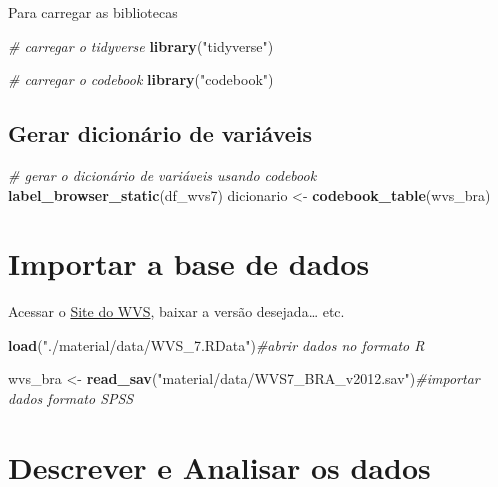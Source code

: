 \documentclass[
]{book}
\newenvironment{Shaded}{\begin{snugshade}}{\end{snugshade}}
\newcommand{\CommentTok}[1]{\textcolor[rgb]{0.56,0.35,0.01}{\textit{#1}}}
\newcommand{\KeywordTok}[1]{\textcolor[rgb]{0.13,0.29,0.53}{\textbf{#1}}}
\newcommand{\NormalTok}[1]{#1}
\newcommand{\StringTok}[1]{\textcolor[rgb]{0.31,0.60,0.02}{#1}}
\begin{document}
Para carregar as bibliotecas

\begin{Shaded}
\begin{Highlighting}[]
\CommentTok{# carregar o tidyverse}
\KeywordTok{library}\NormalTok{(}\StringTok{"tidyverse"}\NormalTok{)}

\CommentTok{# carregar o codebook}
\KeywordTok{library}\NormalTok{(}\StringTok{"codebook"}\NormalTok{)}
\end{Highlighting}
\end{Shaded}

\hypertarget{gerar-dicionuxe1rio-de-variuxe1veis}{%
\section{Gerar dicionário de variáveis}\label{gerar-dicionuxe1rio-de-variuxe1veis}}

\begin{Shaded}
\begin{Highlighting}[]
\CommentTok{# gerar o dicionário de variáveis usando codebook}
\KeywordTok{label_browser_static}\NormalTok{(df_wvs7)}
\NormalTok{dicionario <-}\StringTok{ }\KeywordTok{codebook_table}\NormalTok{(wvs_bra)}
\end{Highlighting}
\end{Shaded}

\hypertarget{importar-a-base-de-dados}{%
\chapter{Importar a base de dados}\label{importar-a-base-de-dados}}

Acessar o \href{http://www.worldvaluessurvey.org/WVSContents.jsp}{Site do WVS}, baixar a versão desejada\ldots{} etc.

\begin{Shaded}
\begin{Highlighting}[]
\KeywordTok{load}\NormalTok{(}\StringTok{"./material/data/WVS_7.RData"}\NormalTok{)}\CommentTok{#abrir dados no formato R}

\NormalTok{wvs_bra <-}\StringTok{ }\KeywordTok{read_sav}\NormalTok{(}\StringTok{"material/data/WVS7_BRA_v2012.sav"}\NormalTok{)}\CommentTok{#importar dados formato SPSS}
\end{Highlighting}
\end{Shaded}

\hypertarget{descrever-e-analisar-os-dados}{%
\chapter{Descrever e Analisar os dados}\label{descrever-e-analisar-os-dados}}
\end{document}
